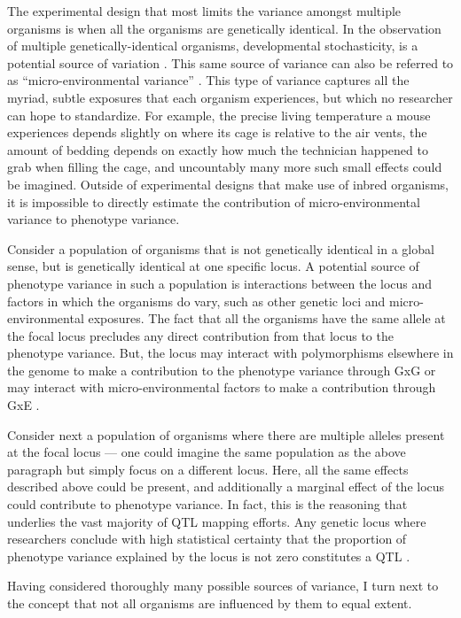 The experimental design that most limits the variance amongst multiple organisms is when all the organisms are genetically identical.
In the observation of multiple genetically-identical organisms, developmental stochasticity, is a potential source of variation \citep{Fraser2010}.
This same source of variance can also be referred to as ``micro-environmental variance'' \citep{Hill2010}.
This type of variance captures all the myriad, subtle exposures that each organism experiences, but which no researcher can hope to standardize.
For example, the precise living temperature a mouse experiences depends slightly on where its cage is relative to the air vents, the amount of bedding depends on exactly how much the technician happened to grab when filling the cage, and uncountably many more such small effects could be imagined.
Outside of experimental designs that make use of inbred organisms, it is impossible to directly estimate the contribution of micro-environmental variance to phenotype variance.

Consider a population of organisms that is not genetically identical in a global sense, but is genetically identical at one specific locus.
A potential source of phenotype variance in such a population is interactions between the locus and factors in which the organisms do vary, such as other genetic loci and micro-environmental exposures.
The fact that all the organisms have the same allele at the focal locus precludes any direct contribution from that locus to the phenotype variance.
But, the locus may interact with polymorphisms elsewhere in the genome to make a contribution to the phenotype variance through GxG or may interact with micro-environmental factors to make a contribution through GxE \citep{Falconer1995-od,Struchalin2010,Ronnegard2011a}.

Consider next a population of organisms where there are multiple alleles present at the focal locus --- one could imagine the same population as the above paragraph but simply focus on a different locus.
Here, all the same effects described above could be present, and additionally a marginal effect of the locus could contribute to phenotype variance.
In fact, this is the reasoning that underlies the vast majority of QTL mapping efforts.
Any genetic locus where researchers conclude with high statistical certainty that the proportion of phenotype variance explained by the locus is not zero constitutes a QTL \citep{Broman2009,Broman2010}.

Having considered thoroughly many possible sources of variance, I turn next to the concept that not all organisms are influenced by them to equal extent.

